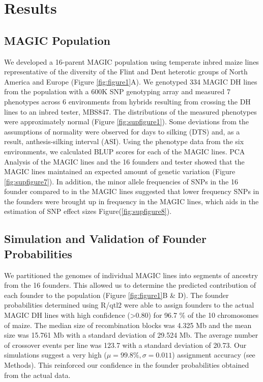 \documentclass[article,9pt,twocolumn,twoside]{rilabRxiv}
\begin{document}
\section{Results}

\subsection{MAGIC Population}

We developed a 16-parent MAGIC population using temperate inbred maize lines representative of the diversity of the Flint and Dent heterotic groups of North America and Europe (Figure \ref{fig:figure1}A).
We genotyped 334 MAGIC DH lines from the population with a 600K SNP genotyping array and measured 7 phenotypes across 6 environments from hybrids resulting from crossing the DH lines to an inbred tester, MBS847.
The distributions of the measured phenotypes were approximately normal (Figure \ref{fig:supfigure1}).
Some deviations from the assumptions of normality were observed for days to silking (DTS) and, as a result, anthesis-silking interval (ASI).
Using the phenotype data from the six environments, we calculated BLUP scores for each of the MAGIC lines.
PCA Analysis of the MAGIC lines and the 16 founders and tester showed that the MAGIC lines maintained an expected amount of genetic variation (Figure \ref{fig:supfigure7}).
In addition, the minor allele frequencies of SNPs in the 16 founder compared to in the MAGIC lines suggested that lower frequency SNPs in the founders were brought up in frequency in the MAGIC lines, which aids in the estimation of SNP effect sizes Figure(\ref{fig:supfigure8}).

\subsection{Simulation and Validation of Founder Probabilities}

We partitioned the genomes of individual MAGIC lines into segments of ancestry from the 16 founders.
This allowed us to determine the predicted contribution of each founder to the population (Figure \ref{fig:figure1}B \& D).
The founder probabilities determined using R/qtl2 were able to assign founders to the actual MAGIC DH lines with high confidence (>0.80) for  96.7 \% of the 10 chromosomes of maize.
The median size of recombination blocks was 4.325 Mb and the mean size was 15.761 Mb with a standard deviation of 29.524 Mb.
The average number of crossover events per line was 123.7 with a standard deviation of 20.73.
Our simulations suggest a very high ($\mu = 99.8\%, \sigma =0.011$) assignment accuracy (see Methods).
This reinforced our confidence in the founder probabilities obtained from the actual data.
\end{document}
